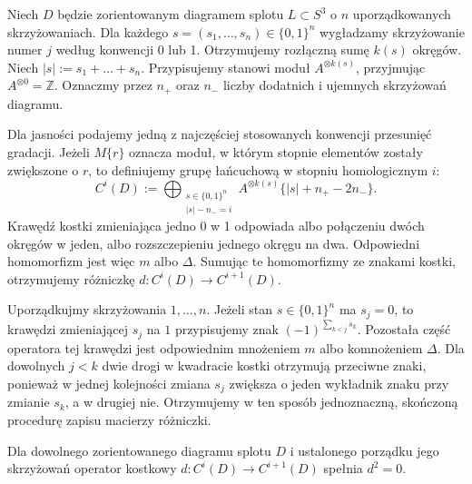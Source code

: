 \begin{definicja}
Niech $D$ będzie zorientowanym diagramem splotu
$L\subset S^3$ o $n$ uporządkowanych skrzyżowaniach.
Dla każdego $s=(s_1,\dots,s_n)\in\{0,1\}^n$
wygładzamy skrzyżowanie numer $j$ według konwencji
0 lub 1. Otrzymujemy rozłączną sumę $k(s)$ okręgów.
Niech $|s|:=s_1+\dots+s_n$.
Przypisujemy stanowi moduł $A^{\otimes k(s)}$, przyjmując
$A^{\otimes0}=\mathbb Z$. Oznaczmy przez $n_+$ oraz $n_-$
liczby dodatnich i ujemnych skrzyżowań diagramu.
\end{definicja}

Dla jasności podajemy jedną z najczęściej stosowanych
konwencji przesunięć gradacji. Jeżeli $M\{r\}$ oznacza
moduł, w którym stopnie elementów zostały zwiększone o $r$,
to definiujemy grupę łańcuchową w stopniu homologicznym $i$:
\[
C^{i}(D):=
\bigoplus_{\substack{s\in\{0,1\}^n\\|s|-n_-=i}}
A^{\otimes k(s)}\{|s|+n_+-2n_-\}.
\]
Krawędź kostki zmieniająca jedno 0 w 1 odpowiada
albo połączeniu dwóch okręgów w jeden, albo rozszczepieniu
jednego okręgu na dwa. Odpowiedni homomorfizm jest więc
$m$ albo $\Delta$. Sumując te homomorfizmy ze znakami
kostki, otrzymujemy różniczkę $d\colon C^i(D)\to C^{i+1}(D)$.

\begin{uwaga}
Uporządkujmy skrzyżowania $1,\dots,n$. Jeżeli stan
$s\in\{0,1\}^n$ ma $s_j=0$, to krawędzi zmieniającej
$s_j$ na $1$ przypisujemy znak
$(-1)^{\sum_{k<j}s_k}$. Pozostała część operatora tej
krawędzi jest odpowiednim mnożeniem $m$ albo
komnożeniem $\Delta$. Dla dowolnych $j<k$ dwie
drogi w kwadracie kostki otrzymują przeciwne znaki,
ponieważ w jednej kolejności zmiana $s_j$ zwiększa
o jeden wykładnik znaku przy zmianie $s_k$, a w drugiej
nie. Otrzymujemy w ten sposób jednoznaczną, skończoną
procedurę zapisu macierzy różniczki.
\end{uwaga}

\begin{stwierdzenie}
Dla dowolnego zorientowanego diagramu splotu $D$ i ustalonego
porządku jego skrzyżowań operator kostkowy
$d:C^i(D)\to C^{i+1}(D)$ spełnia $d^2=0$.
\end{stwierdzenie}

